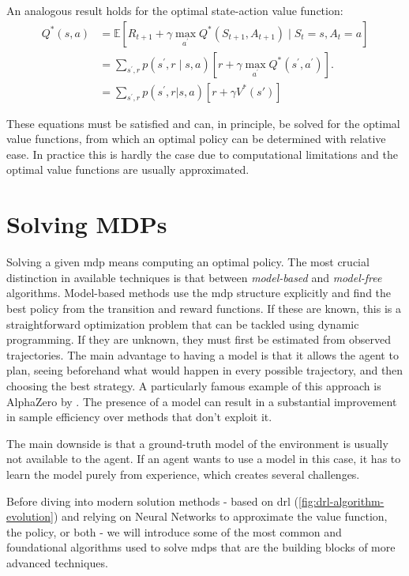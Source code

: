 An analogous result holds for the optimal state-action value function:
\begin{align}
    Q^{\ast }(s,a)&=\mathbb{E}[R_{t+1}+\gamma\max\limits_{a^{\prime }}Q^{\ast
    }(S_{t+1},A_{t+1})\mid S_{t}=s,A_{t}=a] \nonumber \\ 
    & =\sum\limits_{s^{\prime },r}p(s^{\prime },r\mid s,a)\left[ r+\gamma\max\limits_{a^{\prime }}Q^{\ast }(s^{\prime },a^{\prime })\right]. \\
    & = \sum_{s^{\prime}, r} p(s^{\prime}, r | s, a) \left[ r + \gamma V^*(s') \right]
    \label{eq:bellman-state-action}
\end{align}


These equations must be satisfied and can, in principle, be solved for the optimal
value functions, from which an optimal policy can be determined with relative ease.
In practice this is hardly the case due to computational limitations and the optimal value functions 
are usually approximated.

\section{Solving MDPs}
Solving a given \gls{mdp} means computing an optimal policy. The most crucial distinction in available techniques 
is that between \emph{model-based} and \emph{model-free} algorithms. 
Model-based methods use the \gls{mdp} structure explicitly and find the best policy from the transition and reward functions.
If these are known, this is a straightforward optimization problem that can be tackled using dynamic programming. 
If they are unknown, they must first be estimated from observed trajectories.
The main advantage to having a model is that it allows the agent to plan, 
seeing beforehand what would happen in every possible trajectory, and then choosing the best strategy. 
A particularly famous example of this approach is AlphaZero by \cite{Silver2017}.
The presence of a model can result in a substantial improvement in sample efficiency over methods that don't 
exploit it.

The main downside is that a ground-truth model of the environment is usually not available to the agent. 
If an agent wants to use a model in this case, it has to learn the model purely from experience, which 
creates several challenges.


Before diving into modern solution methods - based on \gls{drl} (\cref{fig:drl-algorithm-evolution}) 
and relying on Neural Networks to approximate the value function, the policy, or both - 
we will introduce some of the most common and foundational algorithms used to solve \glspl{mdp} 
that are the building blocks of more advanced techniques.

